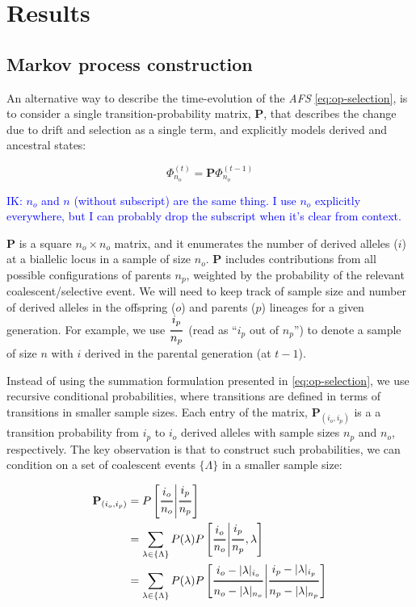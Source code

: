 \documentclass[review]{elsarticle}
\newcommand{\afs}[2]{\Phi_{#1}^{(#2)}}
\newcommand{\Dfrac}[2]{%
  \ooalign{%
    $\genfrac{}{}{1.2pt}0{#1}{#2}$\cr%
    $\color{white}\genfrac{}{}{.4pt}0{\phantom{#1}}{\phantom{#2}}$}%
}
\newcommand{\cond}{\middle\vert}
\newcommand{\ikcomment}[1]{\textcolor{blue}{IK: #1}}
\begin{document}
\section{Results}
\label{sec:results}

\subsection{Markov process construction}
\label{subsec:markov}

An alternative way to describe the time-evolution of the \textit{AFS} \eqref{eq:op-selection}, is to
consider a single transition-probability matrix, $\mathbf{P}$, that describes the change due to
drift and selection as a single term, and explicitly models derived and ancestral states:

\begin{equation}
  \label{eq:app:time-evolution}
  \afs{n_o}{t} = \mathbf{P} \afs{n_o}{t-1}
\end{equation}


\ikcomment{$n_o$ and $n$ (without subscript) are the same thing. I use $n_o$ explicitly everywhere,
  but I can probably drop the subscript when it's clear from context.}

$\mathbf{P}$ is a square $n_o \times n_o$ matrix, and it enumerates the number of derived alleles
($i$) at a biallelic locus in a sample of size $n_o$. $\mathbf{P}$ includes contributions from
all possible configurations of parents $n_p$, weighted by the probability of the relevant
coalescent/selective event. We will need to keep track of sample size and number of derived alleles
in the offspring ($o$) and parents ($p$) lineages for a given generation. For example, we use
$\Dfrac{i_p}{n_p}$ (read as ``$i_p$ out of $n_p$'') to denote a sample of size $n$ with $i$ derived in
the parental generation (at $t-1$).

Instead of using the summation formulation presented in \eqref{eq:op-selection}, we use recursive
conditional probabilities, where transitions are defined in terms of transitions in smaller
sample sizes. Each entry of the matrix, $\mathbf{P}_{(i_o,i_p)}$ is a a transition probability from
$i_p$ to $i_o$ derived alleles with sample sizes $n_p$ and $n_o$, respectively. The key observation
is that to construct such probabilities, we can condition on a set of coalescent events
$\{\Lambda\}$ in a smaller sample size:

\begin{align*}
  \mathbf{P}_{(i_o,i_p)} &= P\left[\Dfrac{i_o}{n_o} \cond \Dfrac{i_p}{n_p}\right] \\
  &= \sum_{\lambda\in\{\Lambda\}}P(\lambda)
  P\left[\Dfrac{i_o}{n_o} \cond \Dfrac{i_p}{n_p},\lambda\right] \\
  &= \sum_{\lambda\in\{\Lambda\}}P(\lambda)
  P\left[\Dfrac{i_o-|\lambda|_{i_o}}{n_o-|\lambda|_{n_o}} \cond \Dfrac{i_p-|\lambda|_{i_p}}{n_p-|\lambda|_{n_p}}\right]
\end{align*}
\end{document}
